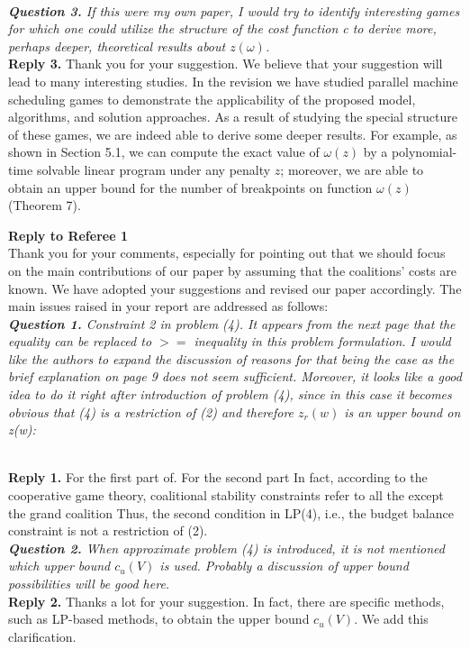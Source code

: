 \documentclass[11pt]{article}
\begin{document}
\\[4mm]
%
%
%
%
\noindent \textit{\textbf{Question 3.}
If this were my own paper, I would try to identify interesting games for which one could utilize the structure of the cost function c to derive more, perhaps deeper, theoretical results about $z(\omega)$.}
\\[2mm]
\noindent \textbf{Reply 3.}
Thank you for your suggestion. We believe that  your suggestion will lead to many interesting studies.
In the revision we have studied parallel machine scheduling games to demonstrate the applicability of the proposed model, algorithms, and solution approaches.
As a result of studying the special structure of these games, we are indeed able to derive some deeper results.
For example, as shown in Section 5.1, we can compute the exact value of $\omega(z)$ by a polynomial-time solvable linear program under any penalty $z$; moreover, we are able to obtain an upper bound for the number of breakpoints on function $\omega(z)$ (Theorem 7).





\newpage
\noindent \textbf{\large Reply to Referee 1}
\\[3mm]
Thank you for your comments, especially for pointing out that we should focus on the main contributions of our paper by assuming that the coalitions' costs are known. We have adopted your suggestions and revised our paper accordingly. The main issues raised in your report are addressed as follows:
\\[4mm]
%
%
%
%
\noindent \textit{\textbf{Question 1.}
Constraint 2 in problem (4). It appears from the next page that the equality can be replaced to $>=$ inequality in this problem formulation. I would like the authors to expand the discussion of reasons for that being the case as the brief explanation on page 9 does not seem sufficient. Moreover, it looks like a good idea to do it right after introduction of problem (4), since in this case it becomes obvious that (4) is a restriction of (2) and therefore $z_r(w)$ is an upper bound on z(w):}

\\[2mm]
\noindent \textbf{Reply 1.}
For the first part of.
For the second part
In fact, according to the cooperative game theory, coalitional stability constraints refer to all the except the grand coalition
Thus, the second condition in LP(4), i.e., the budget balance constraint is not a restriction of (2).
\\[4mm]
%
%
%
\noindent \textit{\textbf{Question 2.}
When approximate problem (4) is introduced, it is not mentioned which upper bound $c_u(V)$ is used. Probably a discussion of upper bound possibilities will be good here.}
\\[2mm]
\noindent \textbf{Reply 2.}
Thanks a lot for your suggestion.
In fact, there are specific methods, such as LP-based methods, to obtain the upper bound $c_u(V)$. We add this clarification.
\end{document}
